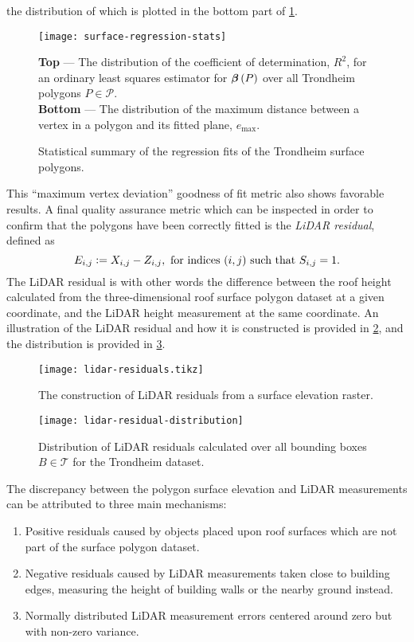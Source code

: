 the distribution of which is plotted in the bottom part of \cref{fig:surface-regression-stats}.
\begin{figure}
  \texttt{[image: surface-regression-stats]}
  \caption{%
    Statistical summary of the regression fits of the Trondheim surface polygons.
  }{%
    \textbf{Top} --- The distribution of the coefficient of determination, $R^2$, for an ordinary least squares estimator for $\boldsymbol{\beta}\left(P\right)$ over all Trondheim polygons $P \in \mathcal{P}$.
    \\
    \textbf{Bottom} --- The distribution of the maximum distance between a vertex in a polygon and its fitted plane, $e_{\mathrm{max}}$.
  }%
  \label{fig:surface-regression-stats}
\end{figure}
This \enquote{maximum vertex deviation} goodness of fit metric also shows favorable results.
A final quality assurance metric which can be inspected in order to confirm that the polygons have been correctly fitted is the \textit{LiDAR residual}, defined as
\begin{equation*}
  E_{i, j}
  \vcentcolon=
  X_{i, j} - Z_{i, j}, \text{ for indices } (i, j) \text{ such that } S_{i, j} = 1.
\end{equation*}
The LiDAR residual is with other words the difference between the roof height calculated from the three-dimensional roof surface polygon dataset at a given coordinate, and the LiDAR height measurement at the same coordinate.
An illustration of the LiDAR residual and how it is constructed is provided in \cref{fig:lidar-residuals}, and the distribution is provided in \cref{fig:lidar-residual-distribution}.
\begin{figure}
  \centering
  \texttt{[image: lidar-residuals.tikz]}
  \caption{%
    The construction of LiDAR residuals from a surface elevation raster.
  }%
  \label{fig:lidar-residuals}
\end{figure}
\begin{figure}
  \centering
  \texttt{[image: lidar-residual-distribution]}
  \caption{%
    Distribution of LiDAR residuals calculated over all bounding boxes $B \in \mathcal{T}$ for the Trondheim dataset.
  }%
  \label{fig:lidar-residual-distribution}
\end{figure}
The discrepancy between the polygon surface elevation and LiDAR measurements can be attributed to three main mechanisms:
\begin{enumerate}
  \item Positive residuals caused by objects placed upon roof surfaces which are not part of the surface polygon dataset.
  \item Negative residuals caused by LiDAR measurements taken close to building edges, measuring the height of building walls or the nearby ground instead.
  \item Normally distributed LiDAR measurement errors centered around zero but with non-zero variance.
\end{enumerate}
